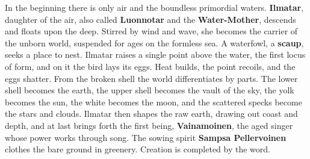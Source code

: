 In the beginning there is only air and the boundless primordial waters. \textbf{Ilmatar}, daughter of the air, also called \textbf{Luonnotar} and the \textbf{Water-Mother}, descends and floats upon the deep. Stirred by wind and wave, she becomes the carrier of the unborn world, suspended for ages on the formless sea. A waterfowl, a \textbf{scaup}, seeks a place to nest. Ilmatar raises a single point above the water, the first locus of form, and on it the bird lays its eggs. Heat builds, the point recoils, and the eggs shatter. From the broken shell the world differentiates by parts. The lower shell becomes the earth, the upper shell becomes the vault of the sky, the yolk becomes the sun, the white becomes the moon, and the scattered specks become the stars and clouds. Ilmatar then shapes the raw earth, drawing out coast and depth, and at last brings forth the first being, \textbf{Vainamoinen}, the aged singer whose power works through song. The sowing spirit \textbf{Sampsa Pellervoinen} clothes the bare ground in greenery. Creation is completed by the word.
